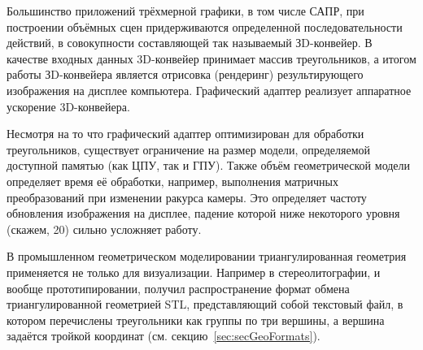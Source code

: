 
Большинство приложений трёхмерной графики, в том числе САПР, при построении объёмных сцен придерживаются определенной последо­вательности действий, в совокупности составляющей так называемый ЗD-конвейер. В качестве входных данных 3D-конвейер принимает массив треугольников, а итогом работы ЗD-конвейера является отрисовка (рендеринг) резуль­тирующего изображения на дисплее компьютера. Графический адаптер реализует аппаратное ускорение 3D-конвейера.

Несмотря на то что графический адаптер оптимизирован для обработки треугольников, существует ограничение на размер модели, определяемой доступной памятью (как ЦПУ, так и ГПУ). Также объём геометрической модели определяет время её обработки, например, выполнения матричных преобразований при изменении ракурса камеры. Это определяет частоту обновления изображения на дисплее, падение которой ниже некоторого уровня (\todo скажем, 20) сильно усложняет работу.



В промышленном геометрическом моделировании триангулированная геометрия применяется не только для визуализации. Например в стереолитографии, и вообще прототипировании, получил распространение формат обмена триангулированной геометрией STL, представляющий собой текстовый файл, в котором перечислены треугольники как группы по три вершины, а вершина задаётся тройкой координат (см. секцию~\ref{sec:secGeoFormats}).


